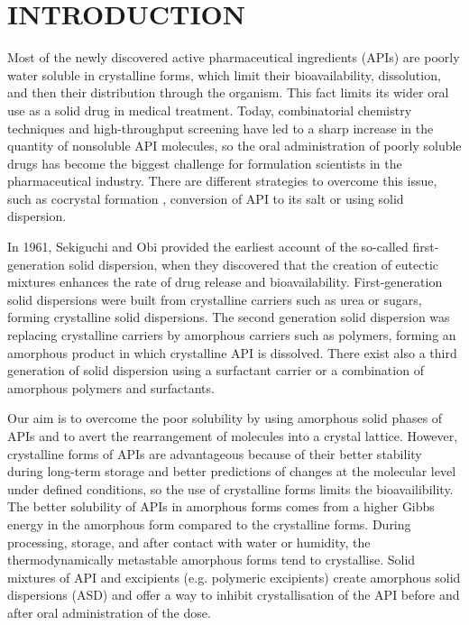 \newpage
\section{INTRODUCTION}
\setcounter{page}{1}
\enlargethispage{\baselineskip}

Most of the newly discovered active pharmaceutical ingredients (APIs) are poorly water soluble in crystalline forms, which limit their bioavailability, dissolution, and then their distribution through the organism. This fact limits its wider oral use as a solid drug in medical treatment. Today, combinatorial chemistry techniques and high-throughput screening have led to a sharp increase in the quantity of nonsoluble API molecules, so the oral administration of poorly soluble drugs has become the biggest challenge for formulation scientists in the pharmaceutical industry. \cite{leuner_improving_2000} There are different strategies to overcome this issue, such as cocrystal formation \cite{batisai_solubility_2021}, conversion of API to its salt \cite{huang_impact_2004} or using solid dispersion. \cite{srinarong_improved_2011} 

In 1961, Sekiguchi and Obi provided the earliest account of the so-called first-generation solid dispersion, when they discovered that the creation of eutectic mixtures enhances the rate of drug release and bioavailability. First-generation solid dispersions were built from crystalline carriers such as urea or sugars, forming crystalline solid dispersions. The second generation solid dispersion was replacing crystalline carriers by amorphous carriers such as polymers, forming an amorphous product in which crystalline API is dissolved. There exist also a third generation of solid dispersion using a surfactant carrier or a combination of amorphous polymers and surfactants.~\cite{vasconcelos_solid_2007}

Our aim is to overcome the poor solubility by using amorphous solid phases of APIs and to avert the rearrangement of molecules into a crystal lattice. However, crystalline forms of APIs are advantageous because of their better stability during long-term storage and better predictions of changes at the molecular level under defined conditions, so the use of crystalline forms limits the bioavailibility. \cite{caron_comparison_2011} The better solubility of APIs in amorphous forms comes from a higher Gibbs energy in the amorphous form compared to the crystalline forms. During processing, storage, and after contact with water or humidity, the thermodynamically metastable amorphous forms tend to crystallise. Solid mixtures of API and excipients (e.g. polymeric excipients) create amorphous solid dispersions (ASD) and offer a way to inhibit crystallisation of the API before and after oral administration of the dose. \cite{prudic_thermodynamic_2014}

